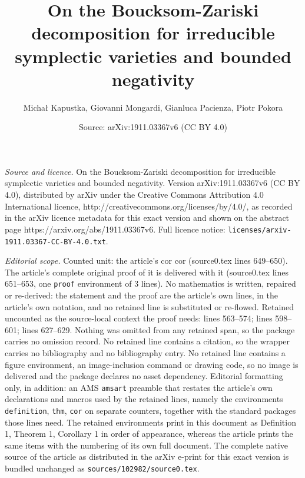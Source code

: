 \documentclass[10pt,a4paper]{amsart}
\title{On the Boucksom-Zariski decomposition for irreducible symplectic varieties and bounded negativity}
\author{Micha{\l} Kapustka, Giovanni Mongardi, Gianluca Pacienza, Piotr Pokora}
\date{Source: arXiv:1911.03367v6 (CC BY 4.0)}
\begin{document}
\maketitle

\noindent\emph{Source and licence.} On the Boucksom-Zariski decomposition for irreducible symplectic varieties and bounded negativity. Version arXiv:1911.03367v6 (CC BY 4.0), distributed by arXiv under the Creative Commons Attribution 4.0 International licence, http://creativecommons.org/licenses/by/4.0/, as recorded in the arXiv licence metadata for this exact version and shown on the abstract page https://arxiv.org/abs/1911.03367v6. Full licence notice: \texttt{licenses/arxiv-1911.03367-CC-BY-4.0.txt}.\par\smallskip

\noindent\textit{Editorial scope.} Counted unit: the article's cor cor (source0.tex lines 649--650). The article's complete original proof of it is delivered with it (source0.tex lines 651--653, one \texttt{proof} environment of 3 lines). No mathematics is written, repaired or re-derived: the statement and the proof are the article's own lines, in the article's own notation, and no retained line is substituted or re-flowed.  Retained uncounted as the source-local context the proof needs: lines 563--574; lines 598--601; lines 627--629.  Nothing was omitted from any retained span, so the package carries no omission record.  No retained line contains a citation, so the wrapper carries no bibliography and no bibliography entry.  No retained line contains a figure environment, an image-inclusion command or drawing code, so no image is delivered and the package declares no asset dependency.  Editorial formatting only, in addition: an AMS \texttt{amsart} preamble that restates the article's own declarations and macros used by the retained lines, namely the environments \texttt{definition}, \texttt{thm}, \texttt{cor} on separate counters, together with the standard packages those lines need.  The retained environments print in this document as Definition 1, Theorem 1, Corollary 1 in order of appearance, whereas the article prints the same items with the numbering of its own full document.  The complete native source of the article as distributed in the arXiv e-print for this exact version is bundled unchanged as \texttt{sources/102982/source0.tex}.
\end{document}
